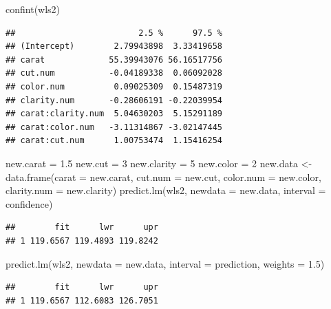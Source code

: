 \documentclass[
]{book}
\newenvironment{Shaded}{\begin{snugshade}}{\end{snugshade}}
\newcommand{\AttributeTok}[1]{\textcolor[rgb]{0.77,0.63,0.00}{#1}}
\newcommand{\DecValTok}[1]{\textcolor[rgb]{0.00,0.00,0.81}{#1}}
\newcommand{\FloatTok}[1]{\textcolor[rgb]{0.00,0.00,0.81}{#1}}
\newcommand{\FunctionTok}[1]{\textcolor[rgb]{0.00,0.00,0.00}{#1}}
\newcommand{\NormalTok}[1]{#1}
\newcommand{\OtherTok}[1]{\textcolor[rgb]{0.56,0.35,0.01}{#1}}
\newcommand{\StringTok}[1]{\textcolor[rgb]{0.31,0.60,0.02}{#1}}
\begin{document}
\begin{Shaded}
\begin{Highlighting}[]
\FunctionTok{confint}\NormalTok{(wls2)}
\end{Highlighting}
\end{Shaded}

\begin{verbatim}
##                         2.5 %      97.5 %
## (Intercept)        2.79943898  3.33419658
## carat             55.39943076 56.16517756
## cut.num           -0.04189338  0.06092028
## color.num          0.09025309  0.15487319
## clarity.num       -0.28606191 -0.22039954
## carat:clarity.num  5.04630203  5.15291189
## carat:color.num   -3.11314867 -3.02147445
## carat:cut.num      1.00753474  1.15416254
\end{verbatim}

\begin{Shaded}
\begin{Highlighting}[]
\NormalTok{new.carat }\OtherTok{=} \FloatTok{1.5}
\NormalTok{new.cut }\OtherTok{=} \DecValTok{3}
\NormalTok{new.clarity }\OtherTok{=} \DecValTok{5}
\NormalTok{new.color }\OtherTok{=} \DecValTok{2}
\NormalTok{new.data }\OtherTok{\textless{}{-}} \FunctionTok{data.frame}\NormalTok{(}\AttributeTok{carat =}\NormalTok{ new.carat, }\AttributeTok{cut.num =}\NormalTok{ new.cut, }\AttributeTok{color.num =}\NormalTok{ new.color, }\AttributeTok{clarity.num =}\NormalTok{ new.clarity)}
\FunctionTok{predict.lm}\NormalTok{(wls2, }\AttributeTok{newdata =}\NormalTok{ new.data, }\AttributeTok{interval =} \StringTok{\textquotesingle{}confidence\textquotesingle{}}\NormalTok{)}
\end{Highlighting}
\end{Shaded}

\begin{verbatim}
##        fit      lwr      upr
## 1 119.6567 119.4893 119.8242
\end{verbatim}

\begin{Shaded}
\begin{Highlighting}[]
\FunctionTok{predict.lm}\NormalTok{(wls2, }\AttributeTok{newdata =}\NormalTok{ new.data, }\AttributeTok{interval =} \StringTok{\textquotesingle{}prediction\textquotesingle{}}\NormalTok{, }\AttributeTok{weights =} \FloatTok{1.5}\NormalTok{)}
\end{Highlighting}
\end{Shaded}

\begin{verbatim}
##        fit      lwr      upr
## 1 119.6567 112.6083 126.7051
\end{verbatim}
\end{document}
